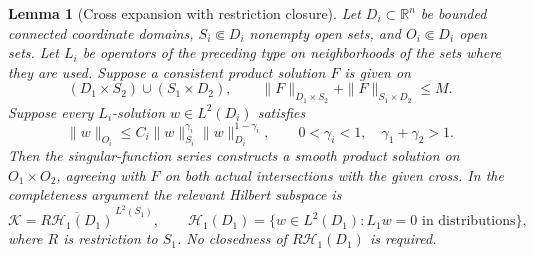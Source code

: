 \documentclass[11pt]{article}
\newtheorem{lemma}[theorem]{Lemma}
\theoremstyle{definition}
\theoremstyle{remark}
\numberwithin{equation}{section}
\begin{document}
\begin{lemma}[Cross expansion with restriction closure]
\label{cross-repairs:range}
Let $D_i\subset\mathbb R^n$ be bounded connected coordinate domains,
$S_i\Subset D_i$ nonempty open sets, and $O_i\Subset D_i$ open sets.
Let $L_i$ be operators of the preceding type on neighborhoods of the
sets where they are used. Suppose a consistent product solution $F$ is
given on
\[
 (D_1\times S_2)\cup(S_1\times D_2),\qquad
 \|F\|_{D_1\times S_2}+\|F\|_{S_1\times D_2}\le M.
\]
Suppose every $L_i$-solution $w\in L^2(D_i)$ satisfies
\[
 \|w\|_{O_i}\le C_i\|w\|_{S_i}^{\gamma_i}
                      \|w\|_{D_i}^{1-\gamma_i},
 \qquad 0<\gamma_i<1,\quad \gamma_1+\gamma_2>1.
\]
Then the singular-function series constructs a smooth product solution
on $O_1\times O_2$, agreeing with $F$ on both actual intersections with
the given cross. In the completeness argument the relevant Hilbert
subspace is
\[
 \mathcal K=\overline{R\mathcal H_1(D_1)}^{\,L^2(S_1)},\qquad
 \mathcal H_1(D_1)=\{w\in L^2(D_1):L_1w=0\text{ in distributions}\},
\]
where $R$ is restriction to $S_1$. No closedness of
$R\mathcal H_1(D_1)$ is required.
\end{lemma}
\end{document}
